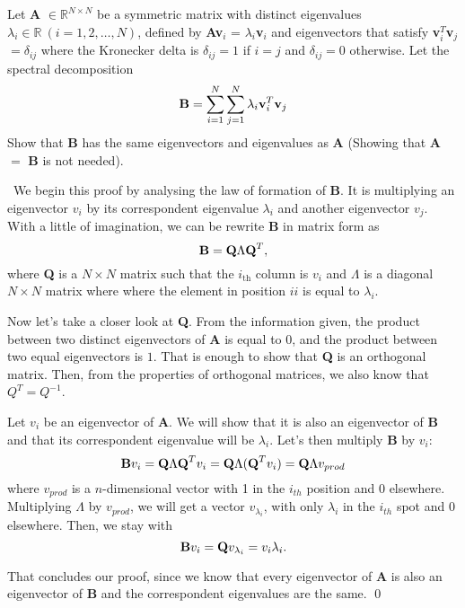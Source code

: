 \documentclass[11pt]{article}
\newenvironment{EX}[2][Exercise]{\begin{trivlist}
\item[{\color{red} \hskip \labelsep {\bfseries #1}\hskip \labelsep {\bfseries #2.}}]}{\end{trivlist}}
\newenvironment{SL}[1][Solution]{\begin{trivlist}
\item[{\color{blue} \hskip \labelsep {\bfseries #1:}}]}{\end{trivlist}}
\begin{document}

\begin{EX}{R.2}
Let \textbf{A} $\in \mathbb{R}^{N \times N}$ be a symmetric matrix with distinct eigenvalues $\lambda_i \in \mathbb{R}\ (i = 1, 2, \ldots, N)$, defined by \textbf{Av$_i$} = $\lambda_i$\textbf{v$_i$} and eigenvectors that satisfy \textbf{v$_i^T$v$_j$}$= \delta_{ij}$ where the Kronecker delta is $\delta_{ij} = 1$ if $i = j$ and $\delta_{ij} = 0$ otherwise. Let the spectral decomposition $$\text{\textbf{B}} = \sum\limits_{i=1}^N\sum\limits_{j=1}^N \lambda_i\text{\textbf{v}}_i^T\text{\textbf{v}}_j$$ Show that \textbf{B} has the same eigenvectors and eigenvalues as \textbf{A} (Showing that \textbf{A} $=$ \textbf{B} is not needed).
\end{EX}

\begin{SL}\
 We begin this proof by analysing the law of formation of \textbf{B}. It is multiplying an eigenvector $v_i$ by its correspondent eigenvalue $\lambda_i$ and another eigenvector $v_j$. With a little of imagination, we can be rewrite \textbf{B} in matrix form as $$\text{\textbf{B}} = \text{\textbf{Q}} \Lambda \text{\textbf{Q}}^T,$$ where \textbf{Q} is a $N \times N$ matrix such that the $i_{\text{th}}$ column is $v_i$ and $\Lambda$ is a diagonal $N \times N$ matrix where where the element in position $ii$ is equal to $\lambda_i$.
 
 Now let's take a closer look at \textbf{Q}. From the information given, the product between two distinct eigenvectors of \textbf{A} is equal to $0$, and the product between two equal eigenvectors is $1$. That is enough to show that \textbf{Q} is an orthogonal matrix. Then, from the properties of orthogonal matrices, we also know that $Q^T = Q^{-1}$.
 
 Let $v_i$ be an eigenvector of \textbf{A}. We will show that it is also an eigenvector of \textbf{B} and that its correspondent eigenvalue will be $\lambda_i$. Let's then multiply \textbf{B} by $v_i$: $$\text{\textbf{B}}v_i = \text{\textbf{Q}} \Lambda \text{\textbf{Q}}^Tv_i = \text{\textbf{Q}} \Lambda (\text{\textbf{Q}}^Tv_i) = \text{\textbf{Q}} \Lambda v_{prod}$$ where $v_{prod}$ is a $n$-dimensional vector with 1 in the $i_{th}$ position and 0 elsewhere. Multiplying $\Lambda$ by $v_{prod}$, we will get a vector $v_{\lambda_i}$, with only $\lambda_i$ in the $i_{th}$ spot and 0 elsewhere. Then, we stay with $$\text{\textbf{B}}v_i = \text{\textbf{Q}}v_{\lambda_i} = v_i\lambda_i.$$
 
 That concludes our proof, since we know that every eigenvector of \textbf{A} is also an eigenvector of \textbf{B} and the correspondent eigenvalues are the same. \qed
\end{SL}
\end{document}
